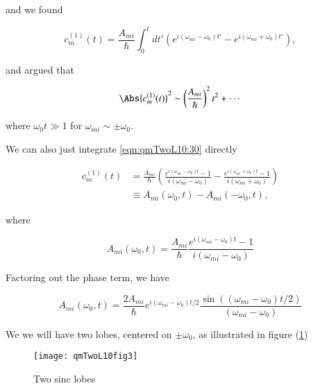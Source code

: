and we found

\begin{equation}\label{eqn:qmTwoL10:30}
c_m^{(1)}(t) = \frac{A_{mi}}{\hbar} \int_0^t dt' \left( 
e^{i (\omega_{mi} - \omega_0) t'} 
-
e^{i (\omega_{mi} + \omega_0) t'} 
\right),
\end{equation}

and argued that 

\begin{equation}\label{eqn:qmTwoL10:50}
\Abs{ c_m^{(1)}(t) }^2  \sim \left( \frac{A_{mi}}{\hbar} \right)^2 t^2 + \cdots
\end{equation}

where $\omega_0 t \gg 1$ for $\omega_{mi} \sim \pm \omega_0$.

We can also just integrate \ref{eqn:qmTwoL10:30} directly

\begin{equation}\label{eqn:qmTwoL10:30b}
\begin{aligned}
c_m^{(1)}(t) 
&= 
\frac{A_{mi}}{\hbar} \left( 
\frac{e^{i (\omega_{mi} - \omega_0) t} - 1}
{ i (\omega_{mi} - \omega_0) }
-
\frac{e^{i (\omega_{mi} + \omega_0) t} - 1}{ i (\omega_{mi} + \omega_0) }
\right) \\
&\equiv 
A_{mi}(\omega_0, t) - A_{mi}(-\omega_0, t),
\end{aligned}
\end{equation}

where 

\begin{equation}\label{eqn:qmTwoL10:70}
A_{mi}(\omega_0, t) =
\frac{A_{mi}}{\hbar} 
\frac{e^{i (\omega_{mi} - \omega_0) t} - 1}
{ i (\omega_{mi} - \omega_0) }
\end{equation}

Factoring out the phase term, we have

\begin{equation}\label{eqn:qmTwoL10:90}
A_{mi}(\omega_0, t) =
\frac{2 A_{mi}}{\hbar} 
e^{i (\omega_{mi} - \omega_0) t/2}
\frac{
\sin(
(\omega_{mi} - \omega_0) t/2
)
}
{ (\omega_{mi} - \omega_0) }
\end{equation}

We we will have two lobes, centered on $\pm \omega_0$, as illustrated in figure (\ref{fig:qmTwoL10:qmTwoL10fig3})
\begin{figure}[htp]
   \centering
   \texttt{[image: qmTwoL10fig3]}
   \caption{Two sinc lobes}\label{fig:qmTwoL10:qmTwoL10fig3}
\end{figure}

